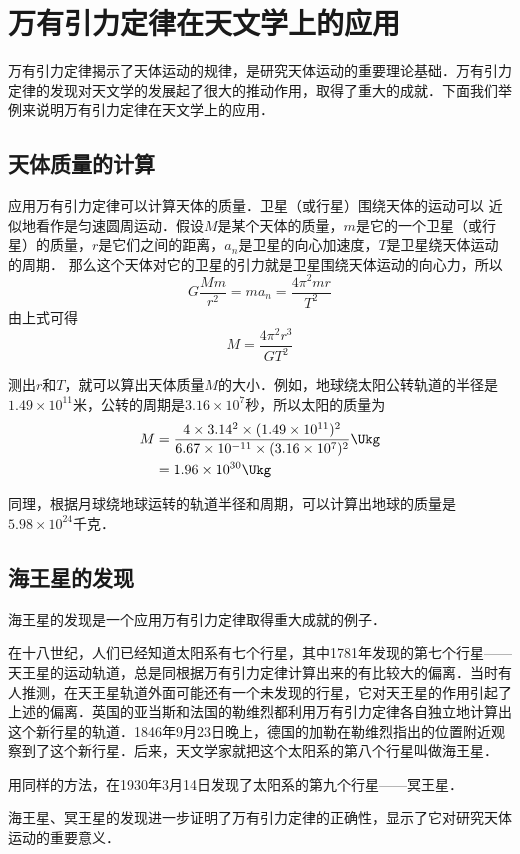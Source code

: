 \section{万有引力定律在天文学上的应用}
万有引力定律揭示了天体运动的规律，是研究天体运动的重要理论基础．万有引力定律的发现对天文学的发展起了很大的推动作用，取得了重大的成就．下面我们举例来说明万有引力定律在天文学上的应用．

\subsection{天体质量的计算} 

应用万有引力定律可以计算天体的质量．卫星（或行星）围绕天体的运动可以
近似地看作是匀速圆周运动．假设$M$是某个天体的质量，$m$是它的一个卫星（或行星）的质量，$r$是它们之间的距离，$a_n$是卫星的向心加速度，$T$是卫星绕天体运动的周期．
那么这个天体对它的卫星的引力就是卫星围绕天体运动的向心力，所以
\[G\frac{Mm}{r^2}=ma_n=\frac{4\pi^2 mr}{T^2} \]
由上式可得
\[M=\frac{4\pi^2r^3}{GT^2} \]

测出$r$和$T$，就可以算出天体质量$M$的大小．例如，地球绕太阳公转轨道的半径是$1.49\times 10^{11}$米，公转的周期是$3.16\times 10^7$秒，所以太阳的质量为
\[\begin{split}
M&= \frac{4\times 3.14^2\times (1.49\times 10^{11})^2}{6.67\times 10^{-11}\times (3.16\times 10^7)^2} \Ukg\\
&=1.96\times 10^{30} \Ukg
\end{split} \]


同理，根据月球绕地球运转的轨道半径和周期，可以计算出地球的质量是$5. 98\times 10^{24}$千克．

\subsection{海王星的发现} 

海王星的发现是一个应用万有引力定律取得重大成就的例子．

在十八世纪，人们已经知道太阳系有七个行星，其中1781年发现的第七个行星——天王星的运动轨道，总是同根据万有引力定律计算出来的有比较大的偏离．当时有人推测，在天王星轨道外面可能还有一个未发现的行星，它对天王星的作用引起了上述的偏离．英国的亚当斯和法国的勒维烈都利用万有引力定律各自独立地计算出这个新行星的轨道．1846年9月23日晚上，德国的加勒在勒维烈指出的位置附近观察到了这个新行星．后来，天文学家就把这个太阳系的第八个行星叫做海王星．

用同样的方法，在1930年3月14日发现了太阳系的第九个行星——冥王星．

海王星、冥王星的发现进一步证明了万有引力定律的正确性，显示了它对研究天体运动的重要意义．


